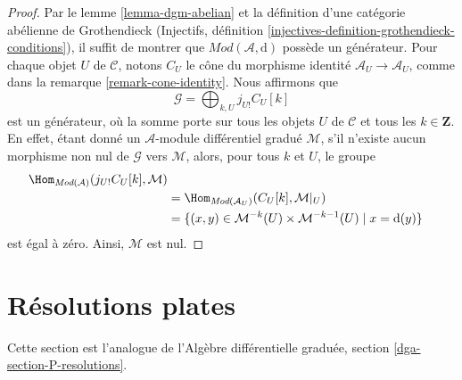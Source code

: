 \begin{proof}
Par le lemme \ref{lemma-dgm-abelian} et la définition d'une catégorie abélienne de Grothendieck (Injectifs, définition \ref{injectives-definition-grothendieck-conditions}), il suffit de montrer que $\textit{Mod}(\mathcal{A}, \text{d})$ possède un générateur.
Pour chaque objet $U$ de $\mathcal{C}$, notons $C_U$ le cône du morphisme identité $\mathcal{A}_U \to \mathcal{A}_U$, comme dans la remarque \ref{remark-cone-identity}.
Nous affirmons que
$$
\mathcal{G} = \bigoplus\nolimits_{k, U} j_{U!}C_U[k]
$$
est un générateur, où la somme porte sur tous les objets $U$ de $\mathcal{C}$ et tous les $k \in \mathbf{Z}$.
En effet, étant donné un $\mathcal{A}$-module différentiel gradué $\mathcal{M}$, s'il n'existe aucun morphisme non nul de $\mathcal{G}$ vers $\mathcal{M}$, alors, pour tous $k$ et $U$, le groupe
\begin{align*}
\Hom_{\textit{Mod}(\mathcal{A})}(j_{U!}C_U[k], \mathcal{M}) \\
& =
\Hom_{\textit{Mod}(\mathcal{A}_U)}(C_U[k], \mathcal{M}|_U) \\
& =
\{(x, y) \in \mathcal{M}^{-k}(U) \times \mathcal{M}^{-k - 1}(U) \mid
x = \text{d}(y)\}
\end{align*}
est égal à zéro.
Ainsi, $\mathcal{M}$ est nul.
\end{proof}











\section{Résolutions plates}
\label{section-P-resolutions}

\noindent
Cette section est l'analogue de l'Algèbre différentielle graduée, section \ref{dga-section-P-resolutions}.

